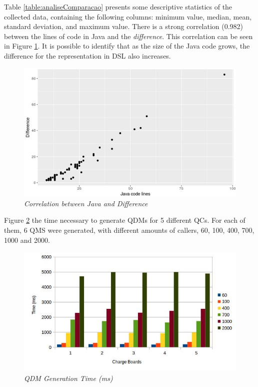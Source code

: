 
Table \ref{table:analiseComparacao} presents some descriptive statistics 
of the collected data, containing the following columns: minimum value, median, mean, standard deviation, and maximum value. 
There is a strong correlation (0.982) between the lines of code in Java and the \emph{difference}. This correlation can be seen in 
Figure \ref{fig:correlacao}. It is possible to identify that as the size of the Java code grows, 
the difference for the representation in DSL also increases.

\begin{figure}[htb!] 
\centering
  \includegraphics[width=.45\textwidth]
  {img/artigo_correlacao.jpg}
  \caption{\it Correlation between Java and Difference}
  \label{fig:correlacao}
\end{figure}

Figure \ref{fig:geracao} the time necessary to generate QDMs for 5 different QCs. For each of them, 
6 QMS were generated, with different amounts of callers, 60, 100, 400, 700, 1000 and 2000.

\begin{figure}[!ht] \centering
  \includegraphics[width=.45\textwidth]
  {img/artigo_geracao.jpg}
  \caption{\it QDM Generation Time (ms)}
  \label{fig:geracao}
\end{figure}

